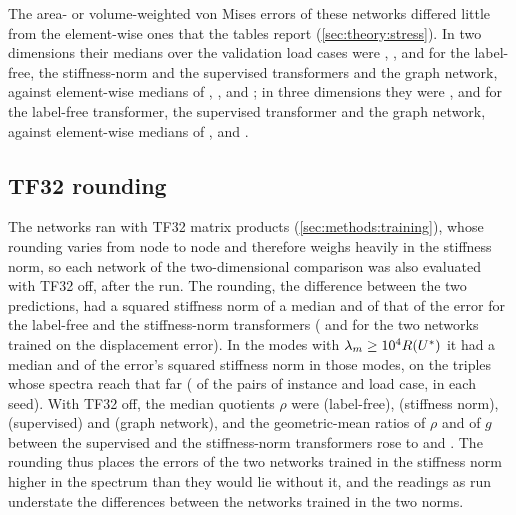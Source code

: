 The area- or volume-weighted von Mises errors of these networks differed little from the
element-wise ones that the tables report (\cref{sec:theory:stress}). In two dimensions
their medians over the validation load cases were \numSpecVmAreaFree{},
\numSpecVmAreaKnorm{}, \numSpecVmAreaLab{} and \numSpecVmAreaMgn{} for the label-free, the
stiffness-norm and the supervised transformers and the graph network, against element-wise
medians of \numSpecVmElemFree{}, \numSpecVmElemKnorm{}, \numSpecVmElemLab{} and
\numSpecVmElemMgn{}; in three dimensions they were \numFieldVmVolFree{},
\numFieldVmVolLab{} and \numFieldVmVolMgn{} for the label-free transformer, the supervised
transformer and the graph network, against element-wise medians of \numFieldVmElemFree{},
\numFieldVmElemLab{} and \numFieldVmElemMgn{}.

\subsection{TF32 rounding}\label{app:repro:tf32}

The networks ran with TF32 matrix products (\cref{sec:methods:training}), whose rounding
varies from node to node and therefore weighs heavily in the stiffness norm, so each
network of the two-dimensional comparison was also evaluated with TF32 off, after the run.
The rounding, the difference between the two predictions, had a squared stiffness norm of a
median \numSpecTfFree{} and \numSpecTfKnorm{} of that of the error for the label-free and
the stiffness-norm transformers (\numSpecTfLab{} and \numSpecTfMgn{} for the two networks
trained on the displacement error). In the modes with $\lambda_m\ge10^4R(U^{\ast})$ it had a
median \numSpecTfStiffFree{} and \numSpecTfStiffKnorm{} of the error's squared stiffness
norm in those modes, on the \numSpecTfStiffN{} triples whose spectra reach that far
(\numSpecTfStiffLoads{} of the \numSpecLoadCases{} pairs of instance and load case, in each
seed). With TF32 off, the median quotients $\rho$ were \numSpecIeeeRqFree{} (label-free),
\numSpecIeeeRqKnorm{} (stiffness norm), \numSpecIeeeRqLab{} (supervised) and
\numSpecIeeeRqMgn{} (graph network), and the geometric-mean ratios of $\rho$ and of $g$
between the supervised and the stiffness-norm transformers rose to
\numSpecIeeeLabKnormRq{} and \numSpecIeeeLabKnormGap{}. The rounding thus places the errors
of the two networks trained in the stiffness norm higher in the spectrum than they would lie
without it, and the readings as run understate the differences between the networks trained
in the two norms.

